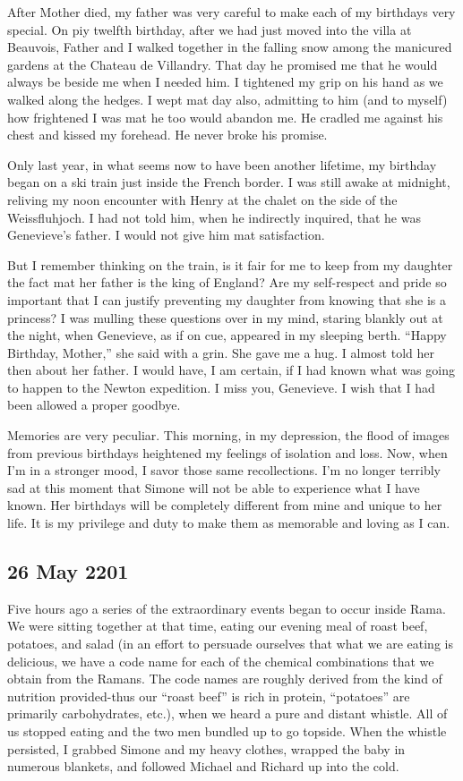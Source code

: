 \documentclass[]{article}
\begin{document}
After Mother died, my father was very careful to make each of my birthdays very special.  On piy twelfth birthday, after we had just moved into the villa at Beauvois, Father and I walked together in the falling snow among the manicured gardens at the Chateau de Villandry.  That day he promised me that he would always be beside me when I needed him.  I tightened my grip on his hand as we walked along the hedges.  I wept mat day also, admitting to him (and to myself) how frightened I was mat he too would abandon me.  He cradled me against his chest and kissed my forehead.  He never broke his promise.

Only last year, in what seems now to have been another lifetime, my birthday began on a ski train just inside the French border.  I was still awake at midnight, reliving my noon encounter with Henry at the chalet on the side of the Weissfluhjoch.  I had not told him, when he indirectly inquired, that he was Genevieve’s father.  I would not give him mat satisfaction.

But I remember thinking on the train, is it fair for me to keep from my daughter the fact mat her father is the king of England? Are my self-respect and pride so important that I can justify preventing my daughter from knowing that she is a princess? I was mulling these questions over in my mind, staring blankly out at the night, when Genevieve, as if on cue, appeared in my sleeping berth.  “Happy Birthday, Mother,” she said with a grin.  She gave me a hug.  I almost told her then about her father.  I would have, I am certain, if I had known what was going to happen to the Newton expedition.  I miss you, Genevieve.  I wish that I had been allowed a proper goodbye.

Memories are very peculiar.  This morning, in my depression, the flood of images from previous birthdays heightened my feelings of isolation and loss.  Now, when I’m in a stronger mood, I savor those same recollections.  I’m no longer terribly sad at this moment that Simone will not be able to experience what I have known.  Her birthdays will be completely different from mine and unique to her life.  It is my privilege and duty to make them as memorable and loving as I can.

\subsection*{26 May 2201}

Five hours ago a series of the extraordinary events began to occur inside Rama.  We were sitting together at that time, eating our evening meal of roast beef, potatoes, and salad (in an effort to persuade ourselves that what we are eating is delicious, we have a code name for each of the chemical combinations that we obtain from the Ramans.  The code names are roughly derived from the kind of nutrition provided-thus our “roast beef” is rich in protein, “potatoes” are primarily carbohydrates, etc.), when we heard a pure and distant whistle.  All of us stopped eating and the two men bundled up to go topside.  When the whistle persisted, I grabbed Simone and my heavy clothes, wrapped the baby in numerous blankets, and followed Michael and Richard up into the cold.
\end{document}
